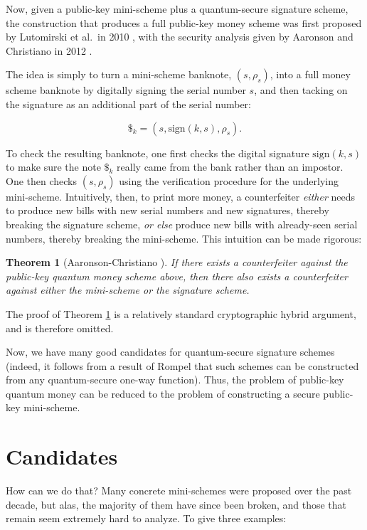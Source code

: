 \documentclass[12pt]{report}
\theoremstyle{plain}
\newtheorem{theorem}{Theorem}[section]
\theoremstyle{definition}
\begin{document}
Now, given a public-key mini-scheme plus a quantum-secure signature scheme, the construction that produces a full public-key money scheme was first proposed by Lutomirski et al.\ in 2010 \cite{breaking}, with the security analysis given by Aaronson and Christiano in 2012 \cite{achristiano}.

The idea is simply to turn a mini-scheme banknote, $(s,\rho_s)$, into a full money scheme banknote by digitally signing the serial number $s$, and then tacking on the signature as an additional part of the serial number:

$$\$_k = (s, \text{sign}(k,s), \rho_s).$$

To check the resulting banknote, one first checks the digital signature $\text{sign}(k,s)$ to make sure the note $\$_k$ really came from the bank rather than an impostor.  One then checks $(s, \rho_s)$ using the verification procedure for the underlying mini-scheme.  Intuitively, then, to print more money, a counterfeiter {\em either} needs to produce new bills with new serial numbers and new signatures, thereby breaking the signature scheme, {\em or else} produce new bills with already-seen serial numbers, thereby breaking the mini-scheme.  This intuition can be made rigorous:

\begin{theorem}[Aaronson-Christiano \cite{achristiano}]
\label{standardcons}
If there exists a counterfeiter against the public-key quantum money scheme above, then there also exists a counterfeiter against either the mini-scheme or the signature scheme.
\end{theorem}

The proof of Theorem \ref{standardcons} is a relatively standard cryptographic hybrid argument, and is therefore omitted.

Now, we have many good candidates for quantum-secure signature schemes (indeed, it follows from a result of Rompel \cite{rompel} that such schemes can be constructed from any quantum-secure one-way function).  Thus, the problem of public-key quantum money can be reduced to the problem of constructing a secure public-key mini-scheme.

\section{Candidates}

How can we do that?  Many concrete mini-schemes were proposed over the past decade, but alas, the majority of them have since been broken, and those that remain seem extremely hard to analyze.  To give three examples:
\end{document}
